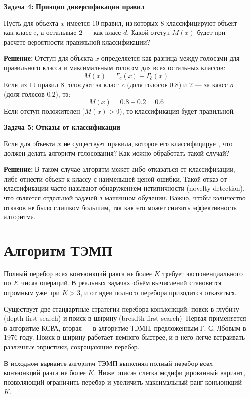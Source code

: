 \textbf{Задача 4: Принцип диверсификации правил}

Пусть для объекта $x$ имеется 10 правил, из которых 8 классифицируют объект как класс $c$, а остальные 2 — как класс $d$. Какой отступ $M(x)$ будет при расчете вероятности правильной классификации?

\textbf{Решение:}  
Отступ для объекта $x$ определяется как разница между голосами для правильного класса и максимальным голосом для всех остальных классов:
\[
M(x) = \Gamma_c(x) - \Gamma_{\overline{c}}(x)
\]
Если из 10 правил 8 голосуют за класс $c$ (доля голосов $0.8$) и 2 — за класс $d$ (доля голосов $0.2$), то:
\[
M(x) = 0.8 - 0.2 = 0.6
\]
Если отступ положителен ($M(x) > 0$), то классификация будет правильной.

\textbf{Задача 5: Отказы от классификации}

Если для объекта $x$ не существует правила, которое его классифицирует, что должен делать алгоритм голосования? Как можно обработать такой случай?

\textbf{Решение:}  
В таком случае алгоритм может либо отказаться от классификации, либо отнести объект к классу с наименьшей ценой ошибки. Такой отказ от классификации часто называют обнаружением нетипичности (novelty detection), что является отдельной задачей в машинном обучении. Важно, чтобы количество отказов не было слишком большим, так как это может снизить эффективность алгоритма.

\section{Алгоритм ТЭМП}

Полный перебор всех конъюнкций ранга не более $K$ требует экспоненциального по $K$ числа операций. В реальных задачах объём вычислений становится огромным уже при $K > 3$, и от идеи полного перебора приходится отказаться.

Существует две стандартные стратегии перебора конъюнкций: поиск в глубину (depth-first search) и поиск в ширину (breadth-first search). Первая применяется в алгоритме КОРА, вторая — в алгоритме ТЭМП, предложенным Г. С. Лбовым в 1976 году. Поиск в ширину работает немного быстрее, и в него легче встраивать различные эвристики, сокращающие перебор.

В исходном варианте алгоритм ТЭМП выполнял полный перебор всех конъюнкций ранга не более $K$. Ниже описан слегка модифицированный вариант, позволяющий ограничить перебор и увеличить максимальный ранг конъюнкций $K$.

